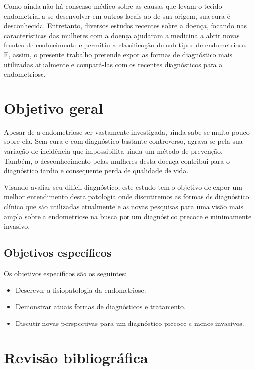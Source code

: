\documentclass[12pt]{article} %
\begin{document}
Como ainda não há consenso médico sobre as causas que levam o tecido
endometrial a se desenvolver em outros locais ao de sua origem, sua
cura é desconhecida. Entretanto, diversos estudos recentes sobre a
doença, focando nas características das mulheres com a doença ajudaram
a medicina a abrir novas frentes de conhecimento e permitiu a
classificação de sub-tipos de endometriose. E, assim, o presente
trabalho pretende expor as formas de diagnóstico mais utilizadas
atualmente e compará-las com os recentes diagnósticos para a
endometriose.

\section{Objetivo geral}

Apesar de a endometriose ser vastamente investigada, ainda sabe-se
muito pouco sobre ela. Sem cura e com diagnóstico bastante controverso,
agrava-se pela sua variação de incidência que impossibilita ainda um
método de prevenção. Também, o desconhecimento pelas mulheres desta
doença contribui para o diagnóstico tardio e consequente perda de
qualidade de vida.

Visando avaliar seu difícil diagnóstico, este estudo tem o objetivo de
expor um melhor entendimento desta patologia onde discutiremos as
formas de diagnóstico clínico que são utilizadas atualmente e as novas
pesquisas para uma visão mais ampla sobre a endometriose na busca por
um diagnóstico precoce e minimamente invasivo.

\subsection{Objetivos específicos}

Os objetivos específicos são os seguintes:

\begin{itemize}
\item Descrever a fisiopatologia da endometriose.
\item Demonstrar atuais formas de diagnósticos e tratamento.
\item Discutir novas perspectivas para um diagnóstico precoce e menos
invasivos.
\end{itemize}
\newpage

\section{Revisão bibliográfica}
\end{document}
